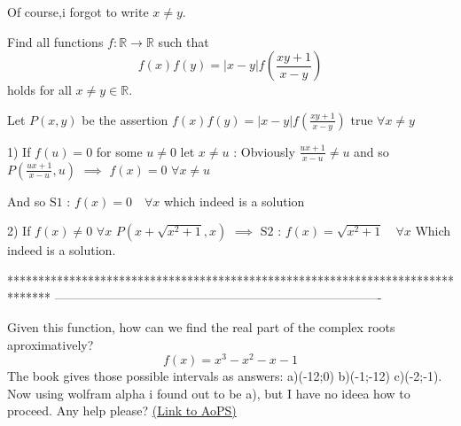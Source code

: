 


\begin{solution}
	Of course,i forgot to write $x\not=y$.
\end{solution}



\begin{solution}
	\begin{tcolorbox}Find all functions $f:\to {}$ such that $$f(x)f(y)=|x-y|f(\frac{xy+1}{x-y})$$ holds for all $x\not=y\in{}$.\end{tcolorbox}
Let $P(x,y)$ be the assertion $f(x)f(y)=|x-y|f()$ true $\forall x\ne y$

1) If $f(u)=0$ for some $u$ 
let $x\ne u$ : Obviously $\ne u$ and so 
$P(,u)$ $\implies$ $f(x)=0$ $\forall x\ne u$

And so $$ which indeed is a solution

2) If $f(x)$ $\forall x$
$P(x+,x)$ $\implies$ $$ 
Which indeed is a solution.
\end{solution}
*******************************************************************************
-------------------------------------------------------------------------------

\begin{problem}
	Given this function, how can we find the real part of the complex roots aproximatively?$$f(x)=x^3-x^2-x-1$$
The book gives those possible intervals as answers: a)(-1\/2;0) b)(-1;-1\/2) c)(-2;-1). Now using wolfram alpha i found out to be a), but I have no ideea how to proceed. Any help please?
	\flushright \href{https://artofproblemsolving.com/community/c6h1596784}{(Link to AoPS)}
\end{problem}



